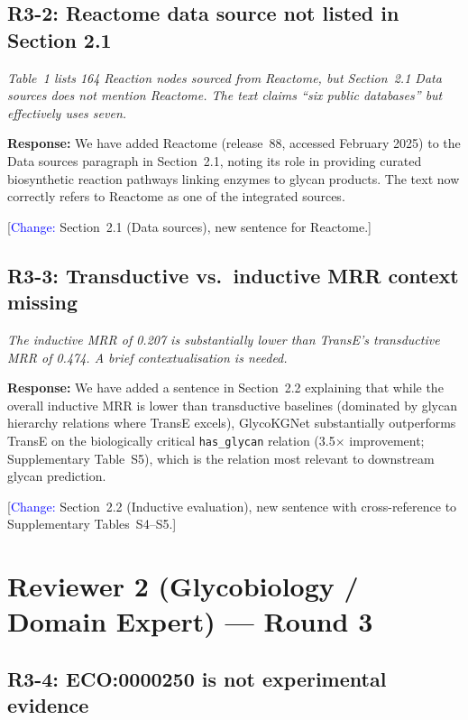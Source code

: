 \documentclass[11pt,a4paper]{article}
\begin{document}
\subsection*{R3-2: Reactome data source not listed in Section 2.1}

\textit{Table~1 lists 164 Reaction nodes sourced from Reactome, but Section~2.1
Data sources does not mention Reactome. The text claims ``six public databases''
but effectively uses seven.}

\textbf{Response:} We have added Reactome (release~88, accessed February 2025)
to the Data sources paragraph in Section~2.1, noting its role in providing
curated biosynthetic reaction pathways linking enzymes to glycan products. The
text now correctly refers to Reactome as one of the integrated sources.

[\textcolor{blue}{Change:} Section~2.1 (Data sources), new sentence for
Reactome.]

\subsection*{R3-3: Transductive vs.\ inductive MRR context missing}

\textit{The inductive MRR of 0.207 is substantially lower than TransE's
transductive MRR of 0.474. A brief contextualisation is needed.}

\textbf{Response:} We have added a sentence in Section~2.2 explaining that while
the overall inductive MRR is lower than transductive baselines (dominated by
glycan hierarchy relations where TransE excels), GlycoKGNet substantially
outperforms TransE on the biologically critical \texttt{has\_glycan} relation
(3.5$\times$ improvement; Supplementary Table~S5), which is the relation most
relevant to downstream glycan prediction.

[\textcolor{blue}{Change:} Section~2.2 (Inductive evaluation), new sentence with
cross-reference to Supplementary Tables~S4--S5.]

\section*{Reviewer 2 (Glycobiology / Domain Expert) --- Round 3}

\subsection*{R3-4: ECO:0000250 is not experimental evidence}
\end{document}
